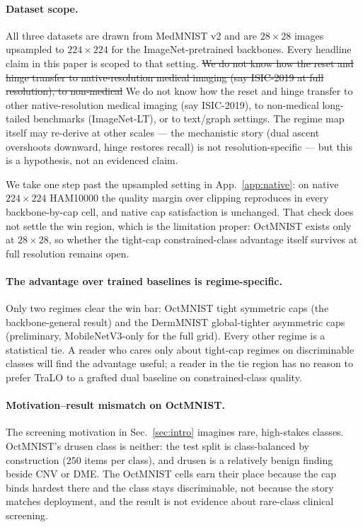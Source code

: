 \documentclass[10pt]{article}
\newcommand{\del}[1]{{\color{red}\sout{#1}}}
\begin{document}
\paragraph{Dataset scope.}
All three datasets are drawn from MedMNIST v2 and are $28{\times}28$
images upsampled to $224{\times}224$ for the ImageNet-pretrained
backbones. Every headline claim in this paper is scoped to that setting.
\del{We do not know how the reset and hinge transfer to native-resolution
medical imaging (say ISIC-2019 at full resolution), to non-medical}
{\color{blue}We do not know how the reset and hinge transfer to other
native-resolution medical imaging (say ISIC-2019), to non-medical}
long-tailed benchmarks (ImageNet-LT), or to text/graph settings. The
regime map itself may re-derive at other scales --- the mechanistic story
(dual ascent overshoots downward, hinge restores recall) is not
resolution-specific --- but this is a hypothesis, not an evidenced claim.

{\color{blue}We take one step past the upsampled setting in App.~\ref{app:native}:
on native $224{\times}224$ HAM10000 the quality margin over clipping reproduces in
every backbone-by-cap cell, and native cap satisfaction is unchanged. That check
does not settle the win region, which is the limitation proper: OctMNIST exists
only at $28{\times}28$, so whether the tight-cap constrained-class advantage itself
survives at full resolution remains open.}

\paragraph{The advantage over trained baselines is regime-specific.}
Only two regimes clear the win bar: OctMNIST tight symmetric caps (the
backbone-general result) and the DermMNIST global-tighter asymmetric caps
(preliminary, MobileNetV3-only for the full grid). Every other regime is
a statistical tie. A reader who cares only about tight-cap regimes on
discriminable classes will find the advantage useful; a reader in the
tie region has no reason to prefer TraLO to a grafted dual baseline on
constrained-class quality.

\paragraph{Motivation--result mismatch on OctMNIST.}
The screening motivation in Sec.~\ref{sec:intro} imagines rare, high-stakes
classes. OctMNIST's drusen class is neither: the test split is
class-balanced by construction ($250$ items per class), and drusen is a
relatively benign finding beside CNV or DME. The OctMNIST cells earn their
place because the cap binds hardest there and the class stays discriminable,
not because the story matches deployment, and the result is not evidence about
rare-class clinical screening.
\end{document}
